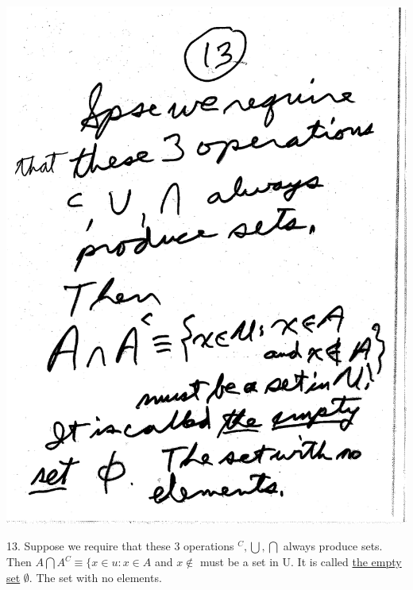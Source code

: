 \documentclass[10pt,a4paper]{article}
\begin{document}
\includegraphics[scale=.5]{Pages/Page_13}

13. Suppose we require that these 3 operations $^C , \bigcup , \bigcap$ always produce sets. Then $A \bigcap A^C \equiv \{ x \in u:x \in A$ and $x \notin $ must be a set in U. 
It is called \underline{the empty set} $\emptyset$. The set with no elements. 

\vspace{.20 in}
\end{document}
